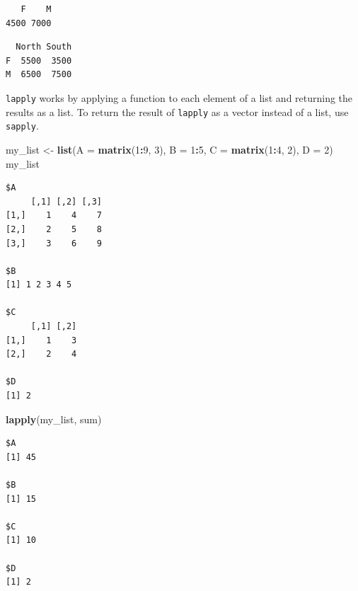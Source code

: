 \documentclass[
]{book}
\newenvironment{Shaded}{\begin{snugshade}}{\end{snugshade}}
\newcommand{\DataTypeTok}[1]{\textcolor[rgb]{0.13,0.29,0.53}{#1}}
\newcommand{\DecValTok}[1]{\textcolor[rgb]{0.00,0.00,0.81}{#1}}
\newcommand{\KeywordTok}[1]{\textcolor[rgb]{0.13,0.29,0.53}{\textbf{#1}}}
\newcommand{\NormalTok}[1]{#1}
\newcommand{\OperatorTok}[1]{\textcolor[rgb]{0.81,0.36,0.00}{\textbf{#1}}}
\newcommand{\StringTok}[1]{\textcolor[rgb]{0.31,0.60,0.02}{#1}}
\begin{document}
\begin{verbatim}
   F    M 
4500 7000 
\end{verbatim}

\begin{Shaded}
\end{Shaded}

\begin{verbatim}
  North South
F  5500  3500
M  6500  7500
\end{verbatim}

\texttt{lapply} works by applying a function to each element of a list and
returning the results as a list. To return the result of \texttt{lapply} as a vector instead of a list, use \texttt{sapply}.

\begin{Shaded}
\begin{Highlighting}[]
\NormalTok{my_list <-}\StringTok{ }\KeywordTok{list}\NormalTok{(}\DataTypeTok{A =} \KeywordTok{matrix}\NormalTok{(}\DecValTok{1}\OperatorTok{:}\DecValTok{9}\NormalTok{, }\DecValTok{3}\NormalTok{), }\DataTypeTok{B =} \DecValTok{1}\OperatorTok{:}\DecValTok{5}\NormalTok{, }\DataTypeTok{C =} \KeywordTok{matrix}\NormalTok{(}\DecValTok{1}\OperatorTok{:}\DecValTok{4}\NormalTok{, }\DecValTok{2}\NormalTok{), }\DataTypeTok{D =} \DecValTok{2}\NormalTok{)}
\NormalTok{my_list}
\end{Highlighting}
\end{Shaded}

\begin{verbatim}
$A
     [,1] [,2] [,3]
[1,]    1    4    7
[2,]    2    5    8
[3,]    3    6    9

$B
[1] 1 2 3 4 5

$C
     [,1] [,2]
[1,]    1    3
[2,]    2    4

$D
[1] 2
\end{verbatim}

\begin{Shaded}
\begin{Highlighting}[]
\KeywordTok{lapply}\NormalTok{(my_list, sum)}
\end{Highlighting}
\end{Shaded}

\begin{verbatim}
$A
[1] 45

$B
[1] 15

$C
[1] 10

$D
[1] 2
\end{verbatim}
\end{document}
